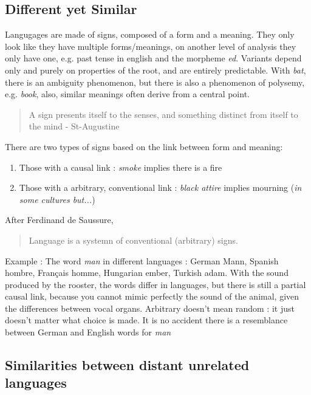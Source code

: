 \documentclass{cours}
\begin{document}
\subsection{Different yet Similar}
Langugages are made of signs, composed of a form and a meaning. They only look like they have multiple forms/meanings, on another level of analysis they only have one, e.g. past tense in english and the morpheme \textsl{ed}. Variants depend only and purely on properties of the root, and are entirely predictable. With \textsl{bat}, there is an ambiguity phenomenon, but there is also a phenomenon of polysemy, e.g. \textsl{book}, also, similar meanings often derive from a central point.
\begin{quote}
    A sign presents itself to the senses, and something distinct from itself to the mind  - St-Augustine
\end{quote}
There are two types of signs based on the link between form and meaning\!:
\begin{enumerate}
    \item Those with a causal link\! : \textsl{smoke} implies there is a fire
    \item Those with a arbitrary, conventional link\! : \textsl{black attire} implies mourning (\textit{in some cultures but...})
\end{enumerate}
After Ferdinand de Saussure, \begin{quote}
    Language is a systemn of conventional (arbitrary) signs.
\end{quote}
Example\! : The word \textsl{man} in different languages\! : German Mann, Spanish hombre, Français homme, Hungarian ember, Turkish adam. With the sound produced by the rooster, the words differ in languages, but there is still a partial causal link, because you cannot mimic perfectly the sound of the animal, given the differences between vocal organs.
Arbitrary doesn't mean random\! : it just doesn't matter what choice is made. It is no accident there is a resemblance between German and English words for \textsl{man}

\subsection{Similarities between distant unrelated languages}
\end{document}

